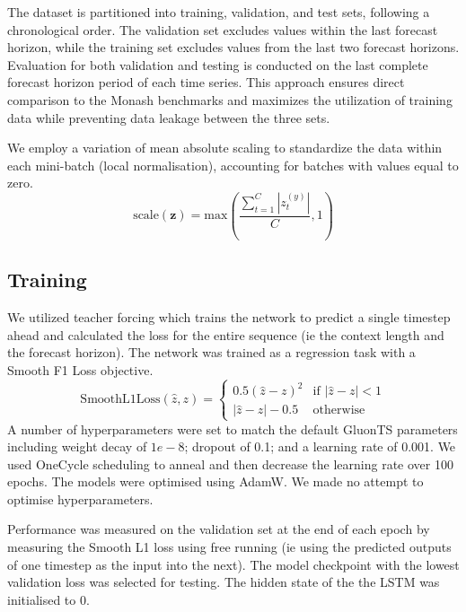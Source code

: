 \documentclass[letterpaper]{article}
\newcommand{\contextlength}{C}
\newcommand{\ts}{t}
\begin{document}
The dataset is partitioned into training, validation, and test sets, following a chronological order. 
The validation set excludes values within the last forecast horizon, while the training set excludes 
values from the last two forecast horizons. Evaluation for both validation and testing is conducted 
on the last complete forecast horizon period of each time series. This approach ensures direct comparison to 
the Monash benchmarks \cite{DBLP:conf/nips/GodahewaBWHM21} and maximizes the 
utilization of training data while preventing data leakage between the three sets.

We employ a variation of mean absolute scaling to standardize the data within each mini-batch (local normalisation), 
accounting for batches with values equal to zero.
\begin{equation}
\text{scale}(\mathbf{z}) = 
\text{max}( \frac{ \sum_{\ts=1}^{\contextlength}|z^{(y)}_\ts|}{\contextlength},  1)
\end{equation}
\subsection{Training}
We utilized teacher forcing which trains the network to predict a single
timestep ahead and calculated the loss for the entire sequence (ie the context length and the forecast horizon).
The network was trained as a regression task with a Smooth F1 Loss objective.
\begin{equation}
\text{SmoothL1Loss}(\hat{z}, z) = 
\begin{cases} 
0.5(\hat{z} - z)^2 & \text{if } |\hat{z} - z| < 1 \\
|\hat{z} - z| - 0.5 & \text{otherwise}
\end{cases}
\end{equation}
A number of hyperparameters were set to match the default
GluonTS parameters \cite{gluonts_arxiv} including weight decay \cite{loshchilov2019decoupled} of $1e-8$; dropout 
\cite{hinton2012improving} of 0.1; and a learning rate of 0.001. We used OneCycle \cite{smith2018superconvergence} scheduling to anneal and then 
decrease the learning rate over 100 epochs. The models were optimised using AdamW. We made no attempt to optimise hyperparameters. 

Performance was measured on the validation set at the end of each epoch by measuring the Smooth L1 loss using
free running (ie using the predicted outputs of one timestep as the input into the next). The model checkpoint
with the lowest validation loss was selected for testing. The hidden state of the the LSTM was initialised to $0$. 
\end{document}
